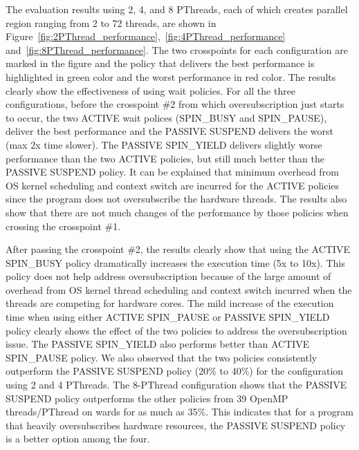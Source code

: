 The evaluation results using 2, 4, and 8 PThreads, each of which creates {\sf parallel} region ranging 
from 2 to 72 threads, are shown in Figure~\ref{fig:2PThread_performance},~\ref{fig:4PThread_performance} 
and~\ref{fig:8PThread_performance}. The two crosspoints for each configuration are marked in the figure and the 
policy that delivers the best performance is highlighted in green color and the worst performance in red color.
The results clearly show the effectiveness of using wait policies. For all the three configurations, 
before the crosspoint \#2 from which oversubscription just starts to occur, 
the two {\sf ACTIVE} wait polices ({\sf SPIN\_BUSY} and {\sf SPIN\_PAUSE}), deliver the best performance and 
the {\sf PASSIVE SUSPEND} delivers the worst (max 2x time slower). 
The {\sf PASSIVE SPIN\_YIELD} delivers slightly worse performance than the two {\sf ACTIVE} policies, but still much better than the 
{\sf PASSIVE SUSPEND} policy. 
It can be explained that minimum overhead from OS kernel scheduling and context switch are incurred for the {\sf ACTIVE} policies since 
the program does not oversubscribe the hardware threads. 
The results also show that there are not much changes of the performance by those policies when crossing the crosspoint \#1. 

After passing the crosspoint \#2, the results clearly show that using the {\sf ACTIVE SPIN\_BUSY} 
policy dramatically increases the execution time (5x to 10x).
This policy does not help address oversubscription because of the large amount of overhead from OS kernel thread scheduling and context switch 
incurred when the threads are competing for hardware cores. The mild increase
of the execution time when using either {\sf ACTIVE SPIN\_PAUSE} or {\sf PASSIVE SPIN\_YIELD} 
policy clearly shows the effect of the two policies to address
the oversubscription issue. The {\sf PASSIVE SPIN\_YIELD} also performs better than {\sf ACTIVE SPIN\_PAUSE} policy. 
We also observed that the two policies consistently outperform the {\sf PASSIVE SUSPEND}
policy (20\% to 40\%) for the configuration using 2 and 4 PThreads. The 8-PThread configuration shows that the 
 {\sf PASSIVE SUSPEND} policy outperforms the other policies from 39 OpenMP threads/PThread on wards for as much as 35\%. 
 This indicates that for a program that heavily oversubscribes hardware resources, the {\sf PASSIVE SUSPEND} 
 policy is a better option among the four.

